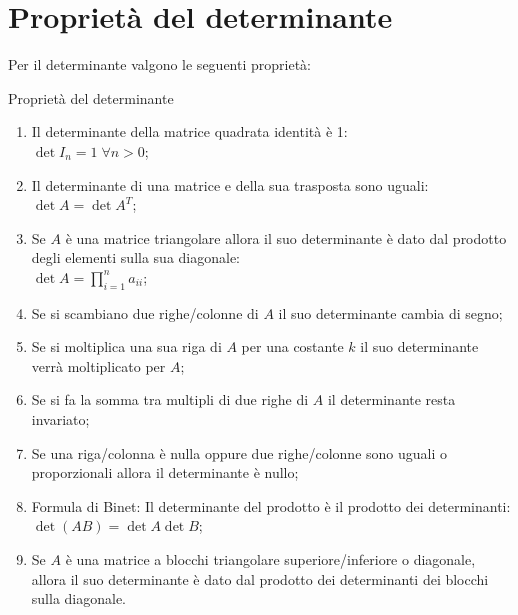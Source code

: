 \section{Proprietà del determinante}
Per il determinante valgono le seguenti proprietà:
\begin{teo}{Proprietà del determinante}
    \begin{enumerate}
        \item Il determinante della matrice quadrata identità è 1:\\ 
            $\det I_n = 1 \;\forall n > 0$;
        \item Il determinante di una matrice e della sua trasposta sono uguali:\\
            $\det A = \det A^T$;
        \item Se $A$ è una matrice triangolare allora il suo determinante è dato dal prodotto degli elementi sulla sua diagonale:\\
        $\det A = \prod_{i = 1}^n a_{ii}$;
        \item Se si scambiano due righe/colonne di $A$ il suo determinante cambia di segno;
        \item Se si moltiplica una sua riga di $A$ per una costante $k$ il suo determinante verrà moltiplicato per $A$;
        \item Se si fa la somma tra multipli di due righe di $A$ il determinante resta invariato;
        \item Se una riga/colonna è nulla oppure due righe/colonne sono uguali o proporzionali allora il determinante è nullo;
        \item Formula di Binet: Il determinante del prodotto è il prodotto dei determinanti:\\
            $\det(AB) = \det A \det B$;
        \item Se $A$ è una matrice a blocchi triangolare superiore/inferiore o diagonale, allora il suo determinante è dato dal prodotto dei determinanti dei blocchi sulla diagonale.
    \end{enumerate}
\end{teo}


